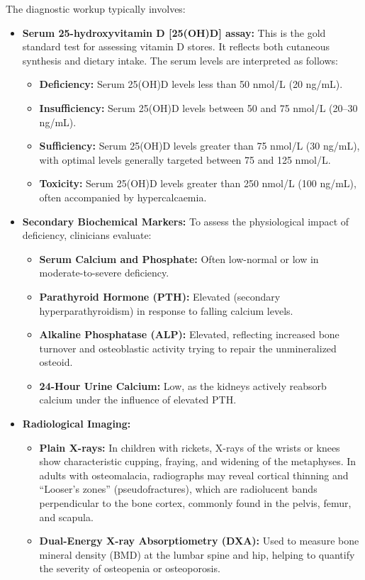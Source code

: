 The diagnostic workup typically involves:
\begin{itemize}
    \item \textbf{Serum 25-hydroxyvitamin D [25(OH)D] assay:} This is the gold standard test for assessing vitamin D stores. It reflects both cutaneous synthesis and dietary intake. The serum levels are interpreted as follows:
    \begin{itemize}
        \item \textbf{Deficiency:} Serum 25(OH)D levels less than 50 nmol/L (20 ng/mL).
        \item \textbf{Insufficiency:} Serum 25(OH)D levels between 50 and 75 nmol/L (20--30 ng/mL).
        \item \textbf{Sufficiency:} Serum 25(OH)D levels greater than 75 nmol/L (30 ng/mL), with optimal levels generally targeted between 75 and 125 nmol/L.
        \item \textbf{Toxicity:} Serum 25(OH)D levels greater than 250 nmol/L (100 ng/mL), often accompanied by hypercalcaemia.
    \end{itemize}
    \item \textbf{Secondary Biochemical Markers:} To assess the physiological impact of deficiency, clinicians evaluate:
    \begin{itemize}
        \item \textbf{Serum Calcium and Phosphate:} Often low-normal or low in moderate-to-severe deficiency.
        \item \textbf{Parathyroid Hormone (PTH):} Elevated (secondary hyperparathyroidism) in response to falling calcium levels.
        \item \textbf{Alkaline Phosphatase (ALP):} Elevated, reflecting increased bone turnover and osteoblastic activity trying to repair the unmineralized osteoid.
        \item \textbf{24-Hour Urine Calcium:} Low, as the kidneys actively reabsorb calcium under the influence of elevated PTH.
    \end{itemize}
    \item \textbf{Radiological Imaging:}
    \begin{itemize}
        \item \textbf{Plain X-rays:} In children with rickets, X-rays of the wrists or knees show characteristic cupping, fraying, and widening of the metaphyses. In adults with osteomalacia, radiographs may reveal cortical thinning and ``Looser's zones'' (pseudofractures), which are radiolucent bands perpendicular to the bone cortex, commonly found in the pelvis, femur, and scapula.
        \item \textbf{Dual-Energy X-ray Absorptiometry (DXA):} Used to measure bone mineral density (BMD) at the lumbar spine and hip, helping to quantify the severity of osteopenia or osteoporosis.
    \end{itemize}
\end{itemize}

